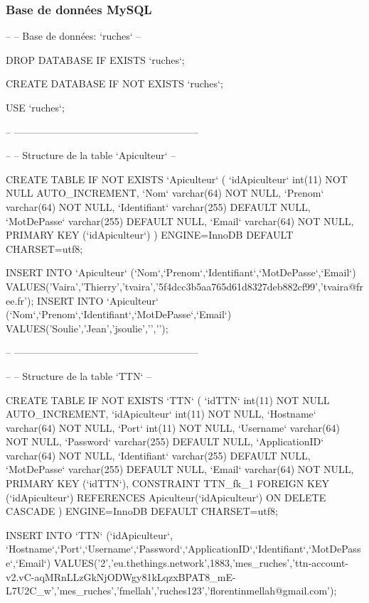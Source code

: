 \subsubsection*{Base de données My\+S\+QL}


\begin{DoxyCode}
--
-- Base de données: `ruches`
--

DROP DATABASE IF EXISTS `ruches`;

CREATE DATABASE IF NOT EXISTS `ruches`;

USE `ruches`;

-- --------------------------------------------------------

--
-- Structure de la table `Apiculteur`
--

CREATE TABLE IF NOT EXISTS `Apiculteur` (
  `idApiculteur` int(11) NOT NULL AUTO\_INCREMENT,
  `Nom` varchar(64) NOT NULL,
  `Prenom` varchar(64) NOT NULL,
  `Identifiant` varchar(255) DEFAULT NULL,
  `MotDePasse` varchar(255) DEFAULT NULL,
  `Email` varchar(64) NOT NULL,  
  PRIMARY KEY (`idApiculteur`)
) ENGINE=InnoDB DEFAULT CHARSET=utf8;

INSERT INTO `Apiculteur` (`Nom`,`Prenom`,`Identifiant`,`MotDePasse`,`Email`)
       VALUES('Vaira','Thierry','tvaira','5f4dcc3b5aa765d61d8327deb882cf99','tvaira@free.fr');
INSERT INTO `Apiculteur` (`Nom`,`Prenom`,`Identifiant`,`MotDePasse`,`Email`)
       VALUES('Soulie','Jean','jsoulie','','');

-- --------------------------------------------------------

--
-- Structure de la table `TTN`
--

CREATE TABLE IF NOT EXISTS `TTN` (
  `idTTN` int(11) NOT NULL AUTO\_INCREMENT,
  `idApiculteur` int(11) NOT NULL,
  `Hostname` varchar(64) NOT NULL,
  `Port` int(11) NOT NULL,
  `Username` varchar(64) NOT NULL,
  `Password` varchar(255) DEFAULT NULL,
  `ApplicationID` varchar(64) NOT NULL,
  `Identifiant` varchar(255) DEFAULT NULL,
  `MotDePasse` varchar(255) DEFAULT NULL,
  `Email` varchar(64) NOT NULL,  
  PRIMARY KEY (`idTTN`),
  CONSTRAINT TTN\_fk\_1 FOREIGN KEY (`idApiculteur`) REFERENCES Apiculteur(`idApiculteur`) ON DELETE CASCADE
) ENGINE=InnoDB DEFAULT CHARSET=utf8;

INSERT INTO `TTN` (`idApiculteur`,
       `Hostname`,`Port`,`Username`,`Password`,`ApplicationID`,`Identifiant`,`MotDePasse`,`Email`)
       VALUES('2','eu.thethings.network',1883,'mes\_ruches','ttn-account-v2.vC-aqMRnLLzGkNjODWgy81kLqzxBPAT8\_mE-L7U2C\_w','mes\_ruches','fmellah','ruches123','florentinmellah@gmail.com');


\end{DoxyCode}
